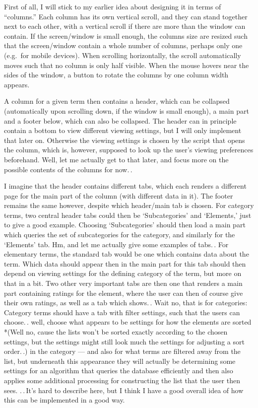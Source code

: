 \documentclass{report}
\begin{document}
First of all, I will stick to my earlier idea about designing it in terms of ``columns.'' Each column has its own vertical scroll, and they can stand together next to each other, with a vertical scroll if there are more than the window can contain. If the screen/window is small enough, the columns size are resized such that the screen/window contain a whole number of columns, perhaps only one (e.g.\ for mobile devices). When scrolling horizontally, the scroll automatically moves such that no column is only half visible. When the mouse hovers near the sides of the window, a button to rotate the columns by one column width appears.

A column for a given term then contains a header, which can be collapsed (automatically upon scrolling down, if the window is small enough), a main part and a footer below, which can also be collapsed. The header can in principle contain a bottom to view different viewing settings, but I will only implement that later on. Otherwise the viewing settings is chosen by the script that opens the column, which is, however, supposed to look up the user's viewing preferences beforehand. Well, let me actually get to that later, and focus more on the possible contents of the columns for now.\,.

I imagine that the header contains different tabs, which each renders a different page for the main part of the column (with different data in it). The footer remains the same however, despite which header/main tab is chosen. For category terms, two central header tabs could then be `Subcategories' and `Elements,' just to give a good example. Choosing `Subcategories' should then load a main part which queries the set of subcategories for the category, and similarly for the `Elements' tab. Hm, and let me actually give some examples of tabs.\,. For elementary terms, the standard tab would be one which contains data about the term. Which data should appear then in the main part for this tab should then depend on viewing settings for the defining category of the term, but more on that in a bit. Two other very important tabs are then one that renders a main part containing ratings for the element, where the user can then of course give their own ratings, as well as a tab which shows.\,. Wait no, that is for categories: Category terms should have a tab with filter settings, such that the users can choose.\,. well, choose what appears to be settings for how the elements are sorted *(Well no, cause the lists won't be sorted exactly according to the chosen settings, but the settings might still look much the settings for adjusting a sort order.\,.) in the category --- and also for what terms are filtered away from the list, but underneath this appearance they will actually be determining some settings for an algorithm that queries the database efficiently and then also applies some additional processing for constructing the list that the user then sees. .\,.\,It's hard to describe here, but I think I have a good overall idea of how this can be implemented in a good way.
\end{document}
